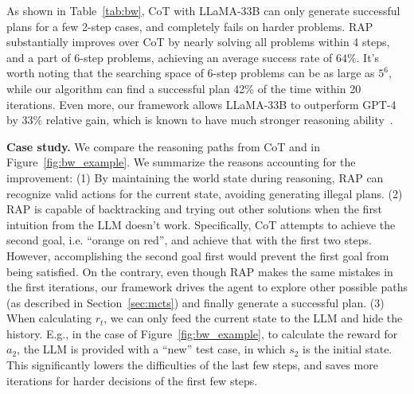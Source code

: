 As shown in Table~\ref{tab:bw}, CoT with LLaMA-33B can only generate successful plans for a few 2-step cases, and completely fails on harder problems. RAP substantially improves over CoT by nearly solving all problems within 4 steps, and a part of 6-step problems, achieving an average success rate of $64\%$. It's worth noting that the searching space of 6-step problems can be as large as $5^6$, while our algorithm can find a successful plan 42\% of the time within 20 iterations. Even more, our framework allows LLaMA-33B to outperform GPT-4 by $33\%$ relative gain, which is known to have much stronger reasoning ability~\cite{bubeck2023sparks}. %


\noindent \textbf{Case study.}
We compare the reasoning paths from CoT and \ours in Figure~\ref{fig:bw_example}. We summarize the reasons accounting for the improvement: (1) By maintaining the world state during reasoning, RAP can recognize valid actions for the current state, avoiding generating illegal plans. (2) RAP is capable of backtracking and trying out other solutions when the first intuition from the LLM doesn't work. Specifically, CoT attempts to achieve the second goal, i.e. ``orange on red'', and achieve that with the first two steps. However, accomplishing the second goal first would prevent the first goal from being satisfied. On the contrary, even though RAP makes the same mistakes in the first iterations, our framework drives the agent to explore other possible paths (as described in Section~\ref{sec:mcts}) and finally generate a successful plan. (3) When calculating $r_t$, we can only feed the current state to the LLM and hide the history. E.g., in the case of Figure~\ref{fig:bw_example}, to calculate the reward for $a_2$, the LLM is provided with a ``new'' test case, in which $s_2$ is the initial state. This significantly lowers the difficulties of the last few steps, and saves more iterations for harder decisions of the first few steps.


